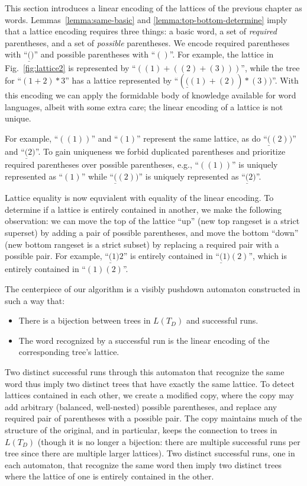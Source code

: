 \documentclass[acmsmall,review,anonymous]{acmart}\settopmatter{printfolios=true,printccs=false,printacmref=false}
\newcommand{\reqpl}{\underline{(}}
\newcommand{\reqpr}{)}
\newcommand{\reqp}[1]{\reqpl#1\reqpr}
\newcommand{\pospl}{(}
\newcommand{\pospr}{)}
\newcommand{\posp}[1]{\pospl#1\pospr}
\begin{document}
This section introduces a linear encoding of the lattices of the previous chapter as words. Lemmas~\ref{lemma:same-basic} and \ref{lemma:top-bottom-determine} imply that a lattice encoding requires three things: a basic word, a set of \emph{required} parentheses, and a set of \emph{possible} parentheses. We encode required parentheses with ``$\reqp{}$'' and possible parentheses with ``$\posp{}$''. For example, the lattice in Fig.~\ref{fig:lattice2} is represented by ``$\posp{\posp{1} + \posp{\posp{2} + \posp{3}}}$'', while the tree for ``$(1 + 2) * 3$'' has a lattice represented by ``$\posp{\reqp{\posp{1} + \posp{2}} * \posp{3}}$''. With this encoding we can apply the formidable body of knowledge available for word languages, albeit with some extra care; the linear encoding of a lattice is not unique.

For example, ``$\posp{\posp{1}}$'' and ``$\posp{1}$'' represent the same lattice, as do ``$\reqp{\posp{2}}$'' and ``$\reqp{2}$''. To gain uniqueness we forbid duplicated parentheses and prioritize required parentheses over possible parentheses, e.g., ``$\posp{\posp{1}}$'' is uniquely represented as ``$\posp{1}$'' while ``$\reqp{\posp{2}}$'' is uniquely represented as ``$\reqp{2}$''.

Lattice equality is now equvialent with equality of the linear encoding. To determine if a lattice is entirely contained in another, we make the following observation: we can move the top of the lattice ``up'' (new top rangeset is a strict superset) by adding a pair of possible parentheses, and move the bottom ``down'' (new bottom rangeset is a strict subset) by replacing a required pair with a possible pair. For example, ``$\reqp{1}2$'' is entirely contained in ``$\reqp{1}\posp{2}$'', which is entirely contained in ``$\posp{1}\posp{2}$''.

The centerpiece of our algorithm is a visibly pushdown automaton constructed in such a way that:

\begin{itemize}
\item There is a bijection between trees in $L(T_D)$ and successful runs.
\item The word recognized by a successful run is the linear encoding of the corresponding tree's lattice.
\end{itemize}

\noindent Two distinct successful runs through this automaton that recognize the same word thus imply two distinct trees that have exactly the same lattice. To detect lattices contained in each other, we create a modified copy, where the copy may add arbitrary (balanced, well-nested) possible parentheses, and replace any required pair of parentheses with a possible pair. The copy maintains much of the structure of the original, and in particular, keeps the connection to trees in $L(T_D)$ (though it is no longer a bijection: there are multiple successful runs per tree since there are multiple larger lattices). Two distinct successful runs, one in each automaton, that recognize the same word then imply two distinct trees where the lattice of one is entirely contained in the other.
\end{document}
